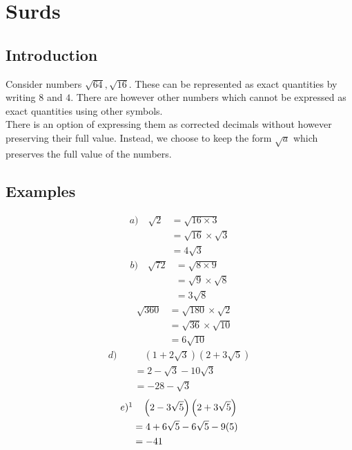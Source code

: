 \documentclass[12pt, a4paper]{report}
\theoremstyle{definition}
\begin{document}
	
	\newpage
	\chapter{Surds}
	\section{Introduction}
	\quad Consider numbers $\sqrt{64}, \sqrt{16}$. These can be represented as exact quantities by writing $8$ and $4$. There are however other numbers which cannot be expressed as exact quantities using other symbols.\\
	
	
	There is an option of expressing them as corrected decimals without however preserving their full value. Instead, we choose to keep the form $\sqrt{a}$ which preserves the full value of the numbers.
	\section{Examples}
	\begin{multicols}{2}
		\noindent
		\begin{alignat*}{2}
			a)\quad
			\sqrt{2} & = \sqrt{16\times3}          \\
			& = \sqrt{16} \times \sqrt{3} \\
			& = 4\sqrt{3}                 
		\end{alignat*}
		\begin{alignat*}{2}
			b)\quad
			\sqrt{72} & = \sqrt{8\times9}         \\
			& = \sqrt{9}\times \sqrt{8} \\
			& = 3\sqrt{8}               
		\end{alignat*}
		\begin{alignat*}{2}
			\quad
			\sqrt{360} & = \sqrt{180} \times \sqrt{2} \\
			& =\sqrt{36}\times\sqrt{10}    \\
			& =6\sqrt{10}                  
		\end{alignat*}
		\begin{alignat*}{2}
			d)\quad
			& \quad\left(1+2\sqrt{3}\right)\left(2+3\sqrt{5}\right) \\
			& = 2-\sqrt{3}  - 10\sqrt{3}                            \\
			& =-28-\sqrt{3}                                         
		\end{alignat*}
		\begin{alignat*}{2}
			e)\footnote[1]\quad
			& \quad\left(2-3\sqrt{5}\right)\left(2+3\sqrt{5}\right) \\
			& = 4+6\sqrt{5}-6\sqrt{5}-9(5)                          \\
			& =-41                                                  
		\end{alignat*}
	\end{multicols}
	\newpage
\end{document}

